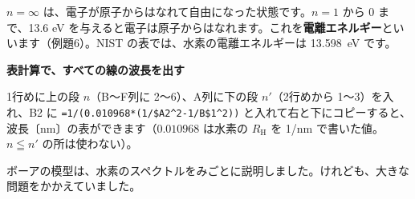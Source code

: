 $n=\infty$ は、電子が原子からはなれて自由になった状態です。$n=1$ から 0 まで、13.6 eV を与えると電子は原子からはなれます。これを\textbf{電離エネルギー}といいます（例題6）。NIST の表では、水素の電離エネルギーは \qty{13.598}{eV} です。

\noindent\textbf{表計算で、すべての線の波長を出す}\par\nobreak
1行めに上の段 $n$（B〜F列に 2〜6）、A列に下の段 $n'$（2行めから 1〜3）を入れ、B2 に \texttt{=1/(0.010968*(1/\$A2\^{}2-1/B\$1\^{}2))} と入れて右と下にコピーすると、波長〔nm〕の表ができます（$0.010968$ は水素の $R_{\mathrm H}$ を 1/nm で書いた値。$n\leqq n'$ の所は使わない）。
\begin{bkcenter}
\label{ph:原-4:tab-sheet}
\end{bkcenter}

\label{ph:原-4:sec7}
ボーアの模型は、水素のスペクトルをみごとに説明しました。けれども、大きな問題をかかえていました。

